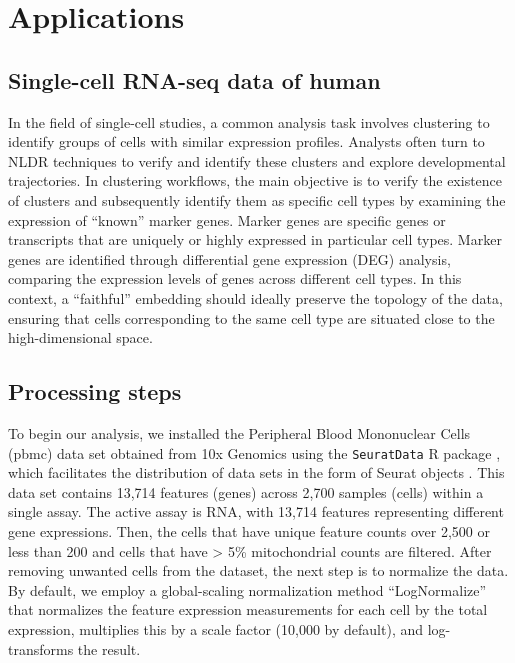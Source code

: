 \documentclass[
  12pt]{article}
\begin{document}
\hypertarget{sec-applications}{%
\section{Applications}\label{sec-applications}}

\hypertarget{single-cell-rna-seq-data-of-human}{%
\subsection{Single-cell RNA-seq data of
human}\label{single-cell-rna-seq-data-of-human}}

In the field of single-cell studies, a common analysis task involves
clustering to identify groups of cells with similar expression profiles.
Analysts often turn to NLDR techniques to verify and identify these
clusters and explore developmental trajectories. In clustering
workflows, the main objective is to verify the existence of clusters and
subsequently identify them as specific cell types by examining the
expression of ``known'' marker genes. Marker genes are specific genes or
transcripts that are uniquely or highly expressed in particular cell
types. Marker genes are identified through differential gene expression
(DEG) analysis, comparing the expression levels of genes across
different cell types. In this context, a ``faithful'' embedding should
ideally preserve the topology of the data, ensuring that cells
corresponding to the same cell type are situated close to the
high-dimensional space.

\hypertarget{processing-steps}{%
\subsection{Processing steps}\label{processing-steps}}

To begin our analysis, we installed the Peripheral Blood Mononuclear
Cells (pbmc) data set obtained from 10x Genomics using the
\texttt{SeuratData} R package \citep{Rahul2019}, which facilitates the
distribution of data sets in the form of Seurat objects
\citep{Yuhan2021}. This data set contains 13,714 features (genes) across
2,700 samples (cells) within a single assay. The active assay is RNA,
with 13,714 features representing different gene expressions. Then, the
cells that have unique feature counts over 2,500 or less than 200 and
cells that have \textgreater{} 5\% mitochondrial counts are filtered.
After removing unwanted cells from the dataset, the next step is to
normalize the data. By default, we employ a global-scaling normalization
method ``LogNormalize'' that normalizes the feature expression
measurements for each cell by the total expression, multiplies this by a
scale factor (10,000 by default), and log-transforms the result.
\end{document}
